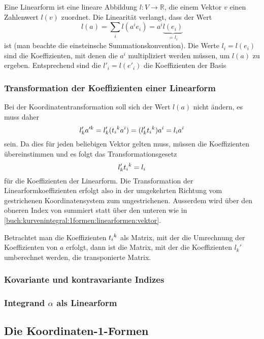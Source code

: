 Eine Linearform ist eine lineare Abbildung $l\colon V\to\mathbb{R}$,
die einem Vektor $v$ einen Zahlenwert $l(v)$ zuordnet.
Die Linearität verlangt, dass der Wert
\[
l(a)
=
\sum_i
l(a^ie_i)
=
a^i \underbrace{l(e_i)}_{\displaystyle=l_i}
\]
ist (man beachte die einsteinsche Summationskonvention).
Die Werte $l_i=l(e_i)$ sind die Koeffizienten, mit denen die $a^i$
multipliziert werden müssen, um $l(a)$ zu ergeben.
Entsprechend sind die $l'_i=l(e'_i)$ die Koeffizienten der Basis

\subsubsection{Transformation der Koeffizienten einer Linearform}
Bei der Koordinatentransformation soll sich der Wert $l(a)$ nicht
ändern, es muss daher
\[
l'_k
a'^k
=
l'_k
(t_i\mathstrut^k a^i)
=
(l'_kt_i\mathstrut^k) a^i
=
l_i
a^i
\]
sein.
Da dies für jeden beliebigen Vektor gelten muss, müssen die Koeffizienten
übereinstimmen und es folgt das Transformationsgesetz
\begin{equation}
l'_kt_i\mathstrut^k
=
l_i
\label{buch:kurvenintegral:1formen:linearformen:linearform}
\end{equation}
für die Koeffizienten der Linearform.
Die Transformation der Linearformkoeffizienten erfolgt also
in der umgekehrten Richtung vom gestrichenen Koordinatensystem 
zum ungestrichenen.
Ausserdem wird über den obneren Index von summiert statt über
den unteren wie in 
\eqref{buch:kurvenintegral:1formen:linearformen:vektor}.

Betrachtet man die Koeffizienten $t_i\mathstrut^k$ als Matrix, mit der
die Umrechnung der Koeffizienten von $a$ erfolgt, dann ist die Matrix,
mit der die Koeffizienten $l_k'$ umberechnet werden, die transponierte
Matrix.

\subsubsection{Kovariante und kontravariante Indizes}

\subsubsection{Integrand $\alpha$ als Linearform}

%
%
\subsection{Die Koordinaten-1-Formen}


